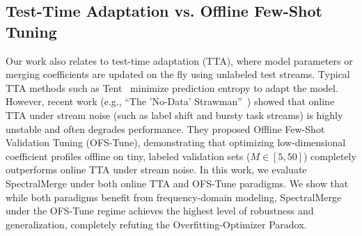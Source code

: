 \subsection{Test-Time Adaptation vs. Offline Few-Shot Tuning}
Our work also relates to test-time adaptation (TTA), where model parameters or merging coefficients are updated on the fly using unlabeled test streams. Typical TTA methods such as Tent~\cite{wang2020tent} minimize prediction entropy to adapt the model. However, recent work (e.g., ``The 'No-Data' Strawman''~\cite{nodata}) showed that online TTA under stream noise (such as label shift and bursty task streams) is highly unstable and often degrades performance. They proposed Offline Few-Shot Validation Tuning (OFS-Tune), demonstrating that optimizing low-dimensional coefficient profiles offline on tiny, labeled validation sets ($M \in [5, 50]$) completely outperforms online TTA under stream noise. In this work, we evaluate SpectralMerge under both online TTA and OFS-Tune paradigms. We show that while both paradigms benefit from frequency-domain modeling, SpectralMerge under the OFS-Tune regime achieves the highest level of robustness and generalization, completely refuting the Overfitting-Optimizer Paradox.
